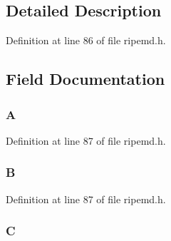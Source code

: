 \subsection{Detailed Description}


Definition at line 86 of file ripemd.\+h.



\subsection{Field Documentation}
\subsubsection[{\texorpdfstring{A}{A}}]{ A}\hypertarget{struct_r_i_p_e_m_d160state__st_acd47b84e3c71e1507ad5228195716a51}{}\label{struct_r_i_p_e_m_d160state__st_acd47b84e3c71e1507ad5228195716a51}


Definition at line 87 of file ripemd.\+h.

\subsubsection[{\texorpdfstring{B}{B}}]{ B}\hypertarget{struct_r_i_p_e_m_d160state__st_a1e5fa97edad3c70dd52f5df645113790}{}\label{struct_r_i_p_e_m_d160state__st_a1e5fa97edad3c70dd52f5df645113790}


Definition at line 87 of file ripemd.\+h.

\subsubsection[{\texorpdfstring{C}{C}}]{ C}\hypertarget{struct_r_i_p_e_m_d160state__st_ad97608d0b1885397727f984432a5eb5f}{}\label{struct_r_i_p_e_m_d160state__st_ad97608d0b1885397727f984432a5eb5f}


